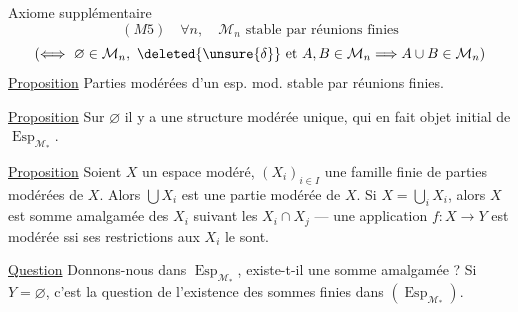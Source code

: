 Axiome supplémentaire
\[
 (M5)\quad \forall n,\quad \mathcal M_n\text{ stable par réunions finies}
\]
\[
 (\Longleftrightarrow\ \varnothing\in\mathcal M_n,\ \deleted{\unsure{\delta}}\text{ et }A,B\in\mathcal M_n\Longrightarrow A\cup B\in\mathcal M_n)
\]
\uline{Proposition} Parties modérées d'un esp. mod. stable par réunions finies.

\uline{Proposition} Sur $\varnothing$ il y a une structure modérée unique, qui en fait objet initial de $\operatorname{Esp}_{\mathcal M_*}$.

\uline{Proposition} Soient $X$ un espace modéré, $(X_i)_{i\in I}$ une famille finie de parties modérées de $X$. Alors $\bigcup X_i$ est une partie modérée de $X$. Si $X=\bigcup_iX_i$, alors $X$ est somme amalgamée des $X_i$ suivant les $X_i\cap X_j$ --- une application $f:X\longrightarrow Y$  est modérée ssi ses restrictions aux $X_i$ le sont.

\uline{Question} Donnons-nous
dans $\operatorname{Esp}_{\mathcal M_*}$, existe-t-il une somme amalgamée ? Si $Y=\varnothing$, c'est la question de l'existence des sommes finies dans $(\operatorname{Esp}_{\mathcal M_*})$.
